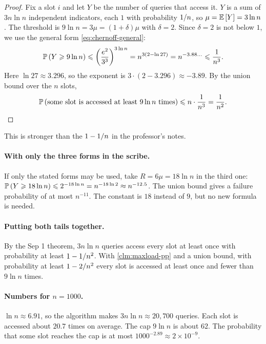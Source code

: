 \begin{proof}
    Fix a slot $i$ and let $Y$ be the number of queries that access it. $Y$ is a sum of $3n \ln n$
    independent indicators, each $1$ with probability $1/n$, so
    $\mu = \operatorname{\mathbb{E}}\left[Y\right] = 3 \ln n$. The threshold is $9 \ln n = 3\mu = (1+\delta)\mu$ with
    $\delta = 2$. Since $\delta = 2$ is not below $1$, we use the general form
    \cref{eq:chernoff-general}:
    \[\operatorname{\mathbb{P}}\left(Y \geqslant 9 \ln n\right) \leqslant \left(\frac{e^{2}}{3^{3}}\right)^{3 \ln n}
        = n^{3(2 - \ln 27)} = n^{-3.88\ldots} \leqslant \frac{1}{n^{3}}.\]
    Here $\ln 27 \approx 3.296$, so the exponent is $3 \cdot (2 - 3.296) \approx -3.89$. By the
    union bound over the $n$ slots,
    \[\operatorname{\mathbb{P}}\left(\text{some slot is accessed at least } 9 \ln n \text{ times}\right) \leqslant n \cdot \frac{1}{n^3} = \frac{1}{n^2}. \qedhere\]
\end{proof}

This is stronger than the $1 - 1/n$ in the professor's notes.

\paragraph{With only the three forms in the scribe.}
If only the stated forms may be used, take $R = 6\mu = 18 \ln n$ in the third one:
$\operatorname{\mathbb{P}}\left(Y \geqslant 18 \ln n\right) \leqslant 2^{-18 \ln n} = n^{-18 \ln 2} \approx n^{-12.5}$. The union bound gives
a failure probability of at most $n^{-11}$. The constant is $18$ instead of $9$, but no new formula
is needed.

\paragraph{Putting both tails together.}
By the Sep 1 theorem, $3n \ln n$ queries access every slot at least once with probability at least
$1 - 1/n^2$. With \cref{clm:maxload-pp} and a union bound, with probability at least
$1 - 2/n^2$ every slot is accessed at least once and fewer than $9 \ln n$ times.

\paragraph{Numbers for $n = 1000$.}
$\ln n \approx 6.91$, so the algorithm makes $3n \ln n \approx 20{,}700$ queries. Each slot is
accessed about $20.7$ times on average. The cap $9 \ln n$ is about $62$. The probability that some
slot reaches the cap is at most $1000^{-2.89} \approx 2 \times 10^{-9}$.
